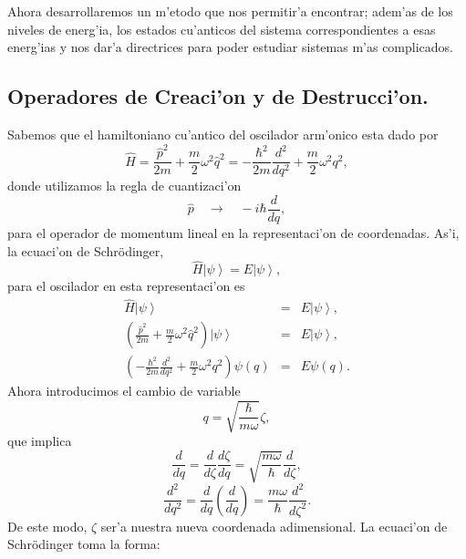 Ahora desarrollaremos un m'etodo que nos permitir'a encontrar; adem'as de
los niveles de energ'ia, los estados cu'anticos del sistema
correspondientes a esas energ'ias y nos dar'a directrices para poder
estudiar sistemas m'as complicados.

\subsection{Operadores de Creaci'on y de Destrucci'on.}

Sabemos que el hamiltoniano cu'antico del oscilador arm'onico esta dado
por
\begin{equation}
\hat{H} =\frac{\hat{p}^{2}}{2m}+\frac{m}{2}\omega^{2}\hat{q}^{2}
=-\frac{\hbar^{2}}{2m}\frac{d^{2}}{dq^{2}}+\frac{m}{2}\omega^{2}q^{2},
\end{equation}
donde utilizamos la regla de cuantizaci'on%
\begin{equation}
\hat{p}\quad\rightarrow\quad-i\hbar\frac{d}{dq} ,
\end{equation}
para el operador de momentum lineal en la representaci'on de coordenadas.
As'i, la ecuaci'on de Schr\"{o}dinger,
\begin{equation}
\hat{H}\left| \psi\right> =E\left| \psi\right> ,
\end{equation}
para el oscilador en esta representaci'on es%
\begin{eqnarray}
\hat{H}\left| \psi\right> & = &E\left| \psi\right> ,\\
\left( \frac{\hat{p}^{2}}{2m}+\frac{m}{2}\omega^{2}\hat{q}^{2}\right) \left|
\psi\right> & = &E\left| \psi\right> ,\\
\left( -\frac{\hbar^{2}}{2m}\frac{d^{2}}{dq^{2}}+\frac{m}{2}\omega^{2}%
q^{2}\right) \psi\left( q\right) & = &E\psi\left( q\right) .
\end{eqnarray}
Ahora introducimos el cambio de variable
\begin{equation}
q=\sqrt{\frac{\hbar}{m\omega}}\zeta ,
\end{equation}
que implica
\begin{equation}
\frac{d}{dq}=\frac{d}{d\zeta}\frac{d\zeta}{dq}=\sqrt{\frac{m\omega}{\hbar}}\frac{d}{d\zeta},
\end{equation}
\begin{equation}
\frac{d^{2}}{dq^{2}}=\frac{d}{dq}\left( \frac{d}{dq}\right) =\frac{m\omega}{\hbar}\frac{d^{2}}{d\zeta^{2}}.
\end{equation} 
De este modo, $\zeta$ ser'a nuestra nueva coordenada adimensional. La ecuaci'on de Schrödinger toma la forma:%
